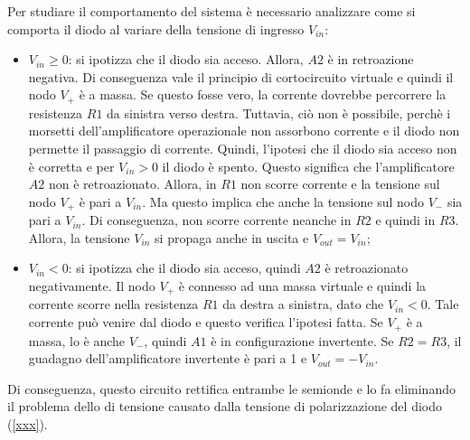 Per studiare il comportamento del sistema è necessario analizzare come si comporta il diodo al variare della tensione di ingresso $V_{in}$:
\begin{itemize}
	\item $V_{in} \geq 0$: si ipotizza che il diodo sia acceso. Allora, $A2$  è in retroazione negativa. Di conseguenza vale il principio di cortocircuito virtuale e quindi il nodo $V_{+}$  è a massa. Se questo fosse vero, la corrente dovrebbe percorrere la resistenza $R1$ da sinistra verso destra. Tuttavia, ciò non è possibile, perchè i morsetti dell'amplificatore operazionale non assorbono corrente e il diodo non permette il passaggio di corrente. Quindi, l'ipotesi che il diodo sia acceso non è corretta e per $V_{in} > 0$ il diodo è spento. Questo significa che l'amplificatore $A2$ non è retroazionato. Allora, in $R1$ non scorre corrente e la tensione sul nodo $V_{+}$ è pari a $V_{in}$. Ma questo implica che anche la tensione sul nodo $V_{-}$ sia pari a $V_{in}$. Di conseguenza, non scorre corrente neanche in $R2$ e quindi in $R3$. Allora, la tensione $V_{in}$ si propaga anche in uscita e $V_{out} = V_{in}$;
	\item $V_{in} < 0$: si ipotizza che il diodo sia acceso, quindi $A2$ è retroazionato negativamente. Il nodo $V_{+}$ è connesso ad una massa virtuale e quindi la corrente scorre nella resistenza $R1$ da destra a sinistra, dato che $V_{in} < 0$. Tale corrente può venire dal diodo e questo verifica l'ipotesi fatta. Se $V_{+}$ è a massa, lo è anche $V_{-}$, quindi $A1$ è in configurazione invertente. Se $R2 = R3$, il guadagno dell'amplificatore invertente è pari a 1 e $V_{out} = -V_{in}$.
\end{itemize}

Di conseguenza, questo circuito rettifica entrambe le semionde e lo fa eliminando il problema dello  di tensione causato dalla tensione di polarizzazione del diodo (\Fig\ref{xxx}). 